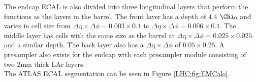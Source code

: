\indent The endcap ECAL is also divided into three longitudinal layers that perform the functions as the layers in the barrel.  The front layer has a depth of 4.4 $\Chi_0$ and varies in cell size from $\Delta\eta \times \Delta\phi = 0.003 \times 0.1$ to $\Delta\eta \times \Delta\phi = 0.006 \times 0.1$. The middle layer has cells with the same size as the barrel at $\Delta\eta \times \Delta\phi = 0.025 \times 0.025$ and a similar depth. The back layer also has a $\Delta\eta \times \Delta\phi$ of $0.05 \times 0.25$.  A presampler also exists for the endcap with each presampler module consisting of two 2mm thick LAr layers. \\

\indent The ATLAS ECAL segmentation can be seen in Figure \ref{LHC:fig:EMCalo}. \\

